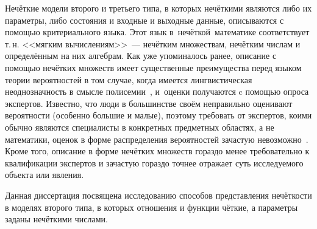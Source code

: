 Нечёткие модели второго и третьего типа, в которых нечёткими являются либо их параметры, либо состояния и входные и выходные данные, описываются с помощью критериального языка. Этот язык в~нечёткой~математике соответствует т.\,н. <<мягким вычислениям>>~--- нечётким множествам, нечётким числам и определённым на них алгебрам. Как уже упоминалось ранее, описание с помощью нечётких множеств имеет существенные преимущества перед языком теории вероятностей в том случае, когда имеется лингвистическая неоднозначность в смысле полисемии~\cite{Borisov_Alexeev_Msk}, и~оценки получаются c помощью опроса экспертов. Известно, что люди в большинстве своём неправильно оценивают вероятности (особенно большие и малые), поэтому требовать от экспертов, коими обычно являются специалисты в конкретных предметных областях, а не математики, оценок в форме распределения вероятностей зачастую невозможно~\cite{Gubko}. Кроме того, описание в форме нечётких множеств гораздо менее требовательно к квалификации экспертов и зачастую гораздо точнее отражает суть исследуемого объекта или явления.

Данная диссертация посвящена исследованию способов представления нечёткости в моделях второго типа, в которых отношения и функции чёткие, а параметры заданы нечёткими числами.